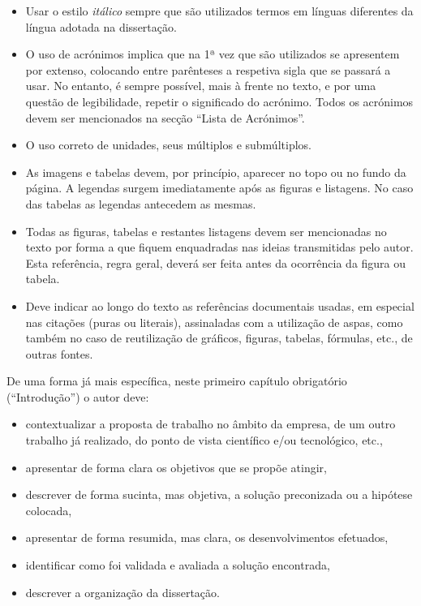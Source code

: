 \begin{itemize}
	\item Usar o estilo \textit{itálico} sempre que são utilizados termos em línguas diferentes da língua adotada na dissertação.
	\item O uso de acrónimos implica que na 1ª vez que são utilizados se apresentem por extenso, colocando entre parênteses a respetiva sigla que se passará a usar. No entanto, é sempre possível, mais à frente no texto, e por uma questão de legibilidade, repetir o significado do acrónimo. Todos os acrónimos devem ser mencionados na secção ``Lista de Acrónimos''.
	\item O uso correto de unidades, seus múltiplos e submúltiplos.
	\item As imagens e tabelas devem, por princípio, aparecer no topo ou no fundo da página. A legendas surgem imediatamente após as figuras e listagens. No caso das tabelas as legendas antecedem as mesmas.
	\item Todas as figuras, tabelas e restantes listagens devem ser mencionadas no texto por forma a que fiquem enquadradas nas ideias transmitidas pelo autor. Esta referência, regra geral, deverá ser feita antes da ocorrência da figura ou tabela.
	\item Deve indicar ao longo do texto as referências documentais usadas, em especial nas citações (puras ou literais), assinaladas com a utilização de aspas, como também no caso de reutilização de gráficos, figuras, tabelas, fórmulas, etc., de outras fontes.
\end{itemize}

De uma forma já mais específica, neste primeiro capítulo obrigatório (``Introdução'') o autor deve:

\begin{itemize}
	\item contextualizar a proposta de trabalho no âmbito da empresa, de um outro trabalho já realizado, do ponto de vista científico e/ou tecnológico, etc.,
	\item apresentar de forma clara os objetivos que se propõe atingir,
	\item descrever de forma sucinta, mas objetiva, a solução preconizada ou a hipótese colocada,
	\item apresentar de forma resumida, mas clara, os desenvolvimentos efetuados,
	\item identificar como foi validada e avaliada a solução encontrada,
	\item descrever a organização da dissertação.
\end{itemize}

